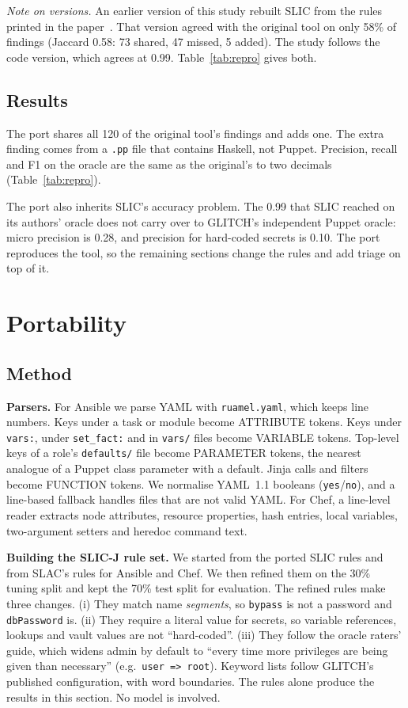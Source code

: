 \documentclass[conference]{IEEEtran}
\newcommand{\slicj}{SLIC-J}
\begin{document}
\textit{Note on versions.} An earlier version of this study rebuilt SLIC from the rules printed in the
paper~\cite{rahman2019seven}. That version agreed with the original tool on only 58\% of findings (Jaccard 0.58: 73
shared, 47 missed, 5 added). The study follows the code version, which agrees at 0.99. Table~\ref{tab:repro} gives
both.



\subsection{Results}
The port shares all 120 of the original tool's findings and adds one. The extra finding comes from a \texttt{.pp}
file that contains Haskell, not Puppet. Precision, recall and F1 on the oracle are the same as the original's to two
decimals (Table~\ref{tab:repro}).

The port also inherits SLIC's accuracy problem. The 0.99 that SLIC reached on its authors' oracle does not carry over
to GLITCH's independent Puppet oracle: micro precision is 0.28, and precision for hard-coded secrets is 0.10. The port
reproduces the tool, so the remaining sections change the rules and add triage on top of it.

\section{Portability}\label{sec:port}
\subsection{Method}
\textbf{Parsers.} For Ansible we parse YAML with \texttt{ruamel.yaml}, which keeps line numbers. Keys under a task or
module become ATTRIBUTE tokens. Keys under \texttt{vars:}, under \texttt{set\_fact:} and in \texttt{vars/} files become
VARIABLE tokens. Top-level keys of a role's \texttt{defaults/} file become PARAMETER tokens, the nearest analogue of a
Puppet class parameter with a default. Jinja calls and filters become FUNCTION tokens. We normalise YAML~1.1 booleans
(\texttt{yes}/\texttt{no}), and a line-based fallback handles files that are not valid YAML. For Chef, a line-level
reader extracts node attributes, resource properties, hash entries, local variables, two-argument setters and
heredoc command text.

\textbf{Building the \slicj{} rule set.} We started from the ported SLIC rules and from SLAC's rules for Ansible and
Chef. We then refined them on the 30\% tuning split and kept the 70\% test split for evaluation. The refined rules
make three changes. (i) They match name \emph{segments}, so \texttt{bypass} is not a password and \texttt{dbPassword}
is. (ii) They require a literal value for secrets, so variable references, lookups and vault values are not
``hard-coded''. (iii) They follow the oracle raters' guide, which widens admin by default to ``every time more
privileges are being given than necessary'' (e.g.\ \texttt{user => root}). Keyword lists follow GLITCH's published
configuration, with word boundaries. The rules alone produce the results in this section. No model is involved.
\end{document}
